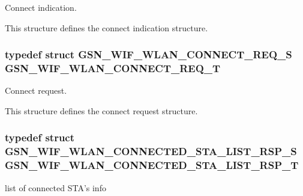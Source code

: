 Connect indication. 

This structure defines the connect indication structure. \hypertarget{a00677_ga017431808d3e402931e4b6bfd133240b}{
\subsubsection[{GSN\_\-WIF\_\-WLAN\_\-CONNECT\_\-REQ\_\-T}]{\setlength{\rightskip}{0pt plus 5cm}typedef struct {\bf GSN\_\-WIF\_\-WLAN\_\-CONNECT\_\-REQ\_\-S}  {\bf GSN\_\-WIF\_\-WLAN\_\-CONNECT\_\-REQ\_\-T}}}
\label{a00677_ga017431808d3e402931e4b6bfd133240b}


Connect request. 

This structure defines the connect request structure. \hypertarget{a00677_ga0cb3a8c19998e8db9e9251598e564b23}{
\subsubsection[{GSN\_\-WIF\_\-WLAN\_\-CONNECTED\_\-STA\_\-LIST\_\-RSP\_\-T}]{\setlength{\rightskip}{0pt plus 5cm}typedef struct {\bf GSN\_\-WIF\_\-WLAN\_\-CONNECTED\_\-STA\_\-LIST\_\-RSP\_\-S}  {\bf GSN\_\-WIF\_\-WLAN\_\-CONNECTED\_\-STA\_\-LIST\_\-RSP\_\-T}}}
\label{a00677_ga0cb3a8c19998e8db9e9251598e564b23}


list of connected STA's info 

